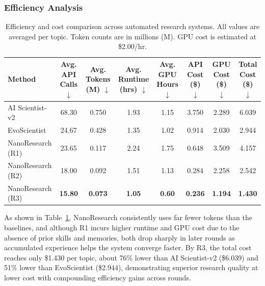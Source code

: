 \documentclass{opendatalab}
\begin{document}
\subsubsection{Efficiency Analysis}
\begin{table}[ht]
\centering
\small
\caption{Efficiency and cost comparison across automated research systems. All values are averaged per topic. Token counts are in millions (M). GPU cost is estimated at \$2.00/hr.}
\setlength{\tabcolsep}{1.1mm}
\begin{tabular}{l|ccccc|cc}
\toprule
Method 
 & \makecell{Avg. API\\Calls $\downarrow$} 
 & \makecell{Avg. Tokens\\(M) $\downarrow$} 
 & \makecell{Avg. Runtime\\(hrs) $\downarrow$} 
 & \makecell{Avg. GPU\\Hours $\downarrow$} 
 & \makecell{API\\Cost (\$) $\downarrow$} 
 & \makecell{GPU\\Cost (\$) $\downarrow$} 
 & \makecell{Total\\Cost (\$) $\downarrow$} \\
\midrule
AI Scientist-v2            & 68.30 & 0.750 & 1.93 & 1.15 & 3.750 & 2.289 & 6.039 \\
EvoScientist               & 24.67 & 0.428 & 1.35 & 1.02 & 0.914 & 2.030 & 2.944 \\
\midrule
NanoResearch (R1)     & 23.65 & 0.117 & 2.24 & 1.75 & 0.648 & 3.509 & 4.157 \\
NanoResearch (R2)     & 18.00 & 0.092 & 1.51 & 1.13 & 0.284 & 2.258 & 2.542 \\
NanoResearch (R3)     & \textbf{15.80} & \textbf{0.073} & \textbf{1.05} & \textbf{0.60} & \textbf{0.236} & \textbf{1.194} & \textbf{1.430} \\
\bottomrule
\end{tabular}
\label{tab:cost}
\end{table}

As shown in Table~\ref{tab:cost}, NanoResearch consistently uses far fewer tokens than the baselines, and although R1 incurs higher runtime and GPU cost due to the absence of prior skills and memories, both drop sharply in later rounds as accumulated experience helps the system converge faster. By R3, the total cost reaches only \$1.430 per topic, about 76\% lower than AI Scientist-v2 (\$6.039) and 51\% lower than EvoScientist (\$2.944), demonstrating superior research quality at lower cost with compounding efficiency gains across rounds.
\end{document}
